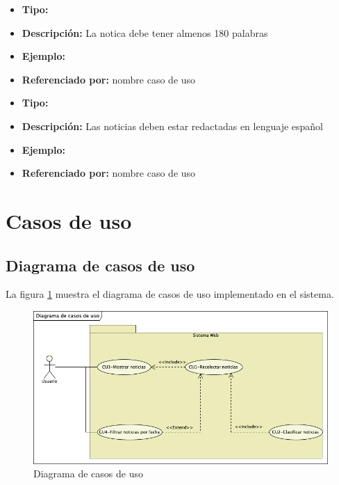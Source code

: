   \begin{itemize}
    \item \textbf{Tipo:}  
    \item \textbf{Descripción:}  La notica debe tener almenos 180 palabras
    \item \textbf{Ejemplo:}
    \item \textbf{Referenciado por:} nombre caso de uso \\
  \end{itemize}


  \begin{itemize}
    \item \textbf{Tipo:}  
    \item \textbf{Descripción:}  Las noticias deben estar redactadas en lenguaje español
    \item \textbf{Ejemplo:}
    \item \textbf{Referenciado por:} nombre caso de uso \\
  \end{itemize}



\newpage
\section{Casos de uso}


\subsection{Diagrama de casos de uso}
La figura \ref{fig:DCU} muestra el diagrama de casos de uso implementado en el sistema.

\begin{figure}[h]
  \centering
  \includegraphics[scale=.5]{imagenes/Diagramas/CasosDeuso}
  \caption{Diagrama de casos de uso}
  \label{fig:DCU}
\end{figure}


